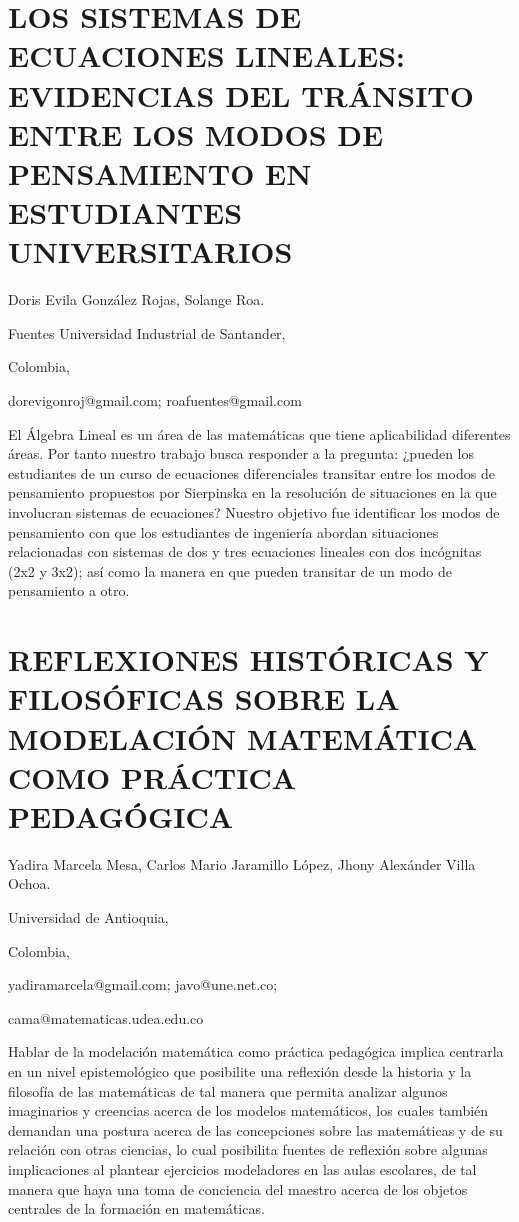 \section{LOS SISTEMAS DE ECUACIONES LINEALES: EVIDENCIAS DEL TRÁNSITO ENTRE
LOS MODOS DE PENSAMIENTO EN ESTUDIANTES UNIVERSITARIOS }

\begin{datos}

Doris Evila González Rojas, Solange Roa.

Fuentes Universidad Industrial de Santander,

Colombia,

dorevigonroj@gmail.com; roafuentes@gmail.com

\end{datos}

El Álgebra Lineal es un área de las matemáticas que tiene aplicabilidad
diferentes áreas. Por tanto nuestro trabajo busca responder a la pregunta:
¿pueden los estudiantes de un curso de ecuaciones diferenciales transitar
entre los modos de pensamiento propuestos por Sierpinska en la resolución
de situaciones en la que involucran sistemas de ecuaciones? Nuestro
objetivo fue identificar los modos de pensamiento con que los estudiantes
de ingeniería abordan situaciones relacionadas con sistemas de dos
y tres ecuaciones lineales con dos incógnitas (2x2 y 3x2); así como
la manera en que pueden transitar de un modo de pensamiento a otro. 


\section{REFLEXIONES HISTÓRICAS Y FILOSÓFICAS SOBRE LA MODELACIÓN MATEMÁTICA
COMO PRÁCTICA PEDAGÓGICA}

\begin{datos}

Yadira Marcela Mesa, Carlos Mario Jaramillo López, Jhony Alexánder
Villa Ochoa.

Universidad de Antioquia,

Colombia,

yadiramarcela@gmail.com; javo@une.net.co; 

cama@matematicas.udea.edu.co

\end{datos}

Hablar de la modelación matemática como práctica pedagógica implica
centrarla en un nivel epistemológico que posibilite una reflexión
desde la historia y la filosofía de las matemáticas de tal manera
que permita analizar algunos imaginarios y creencias acerca de los
modelos matemáticos, los cuales también demandan una postura acerca
de las concepciones sobre las matemáticas y de su relación con otras
ciencias, lo cual posibilita fuentes de reflexión sobre algunas implicaciones
al plantear ejercicios modeladores en las aulas escolares, de tal
manera que haya una toma de conciencia del maestro acerca de los objetos
centrales de la formación en matemáticas.

